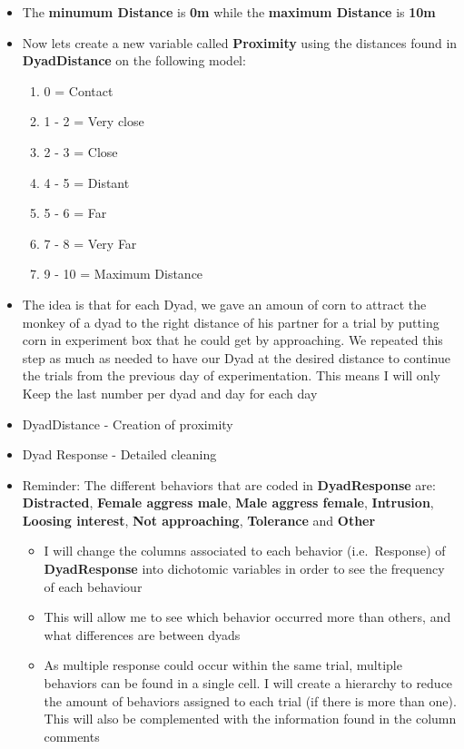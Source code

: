 \documentclass[
]{article}
\providecommand{\tightlist}{%
  \setlength{\itemsep}{0pt}\setlength{\parskip}{0pt}}
\begin{document}
\begin{itemize}
\item
  The \textbf{minumum Distance} is \textbf{0m} while the \textbf{maximum
  Distance} is \textbf{10m}
\item
  Now lets create a new variable called \textbf{Proximity} using the
  distances found in \textbf{DyadDistance} on the following model:

  \begin{enumerate}
  \def\labelenumi{\alph{enumi}.}
  \tightlist
  \item
    0 = Contact
  \item
    1 - 2 = Very close
  \item
    2 - 3 = Close
  \item
    4 - 5 = Distant
  \item
    5 - 6 = Far
  \item
    7 - 8 = Very Far
  \item
    9 - 10 = Maximum Distance
  \end{enumerate}
\item
  The idea is that for each Dyad, we gave an amoun of corn to attract
  the monkey of a dyad to the right distance of his partner for a trial
  by putting corn in experiment box that he could get by approaching. We
  repeated this step as much as needed to have our Dyad at the desired
  distance to continue the trials from the previous day of
  experimentation. This means I will only Keep the last number per dyad
  and day for each day
\item
  DyadDistance - Creation of proximity
\item
  Dyad Response - Detailed cleaning
\item
  Reminder: The different behaviors that are coded in
  \textbf{DyadResponse} are: \textbf{Distracted}, \textbf{Female aggress
  male}, \textbf{Male aggress female}, \textbf{Intrusion},
  \textbf{Loosing interest}, \textbf{Not approaching},
  \textbf{Tolerance} and \textbf{Other}

  \begin{itemize}
  \tightlist
  \item
    I will change the columns associated to each behavior
    (i.e.~Response) of \textbf{DyadResponse} into dichotomic variables
    in order to see the frequency of each behaviour
  \item
    This will allow me to see which behavior occurred more than others,
    and what differences are between dyads
  \item
    As multiple response could occur within the same trial, multiple
    behaviors can be found in a single cell. I will create a hierarchy
    to reduce the amount of behaviors assigned to each trial (if there
    is more than one). This will also be complemented with the
    information found in the column comments


\end{itemize}
\end{itemize}
\end{document}
